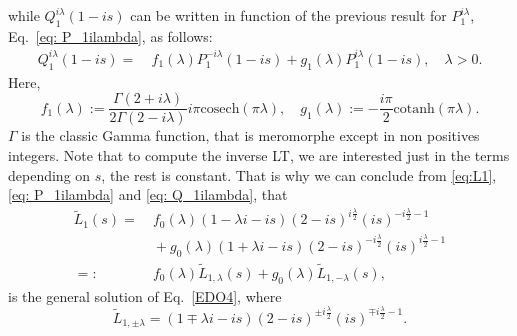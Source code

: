 \documentclass[%
 aip,
 jmp,%
 amsmath,amssymb,
 reprint,%
]{revtex4-2}
\begin{document}
while $Q_1^{i\lambda}(1-is)$ can be written in function of the previous result for $P_1^{i\lambda}$, Eq.~\eqref{eq: P_1ilambda}, as follows:
\begin{equation} \label{eq: Q_1ilambda}
    \begin{aligned}
    Q_1^{i\lambda}(1-is)= &~{} f_1(\lambda)P_1^{-i \lambda }(1-i s) + g_1(\lambda) P_1^{i \lambda }(1-i s), \quad \lambda>0. %
    \end{aligned}
\end{equation}
Here,
\[
f_1(\lambda):= \frac{ \Gamma (2+i \lambda)}{2 \Gamma (2-i \lambda )}i \pi  \text{cosech}(\pi  \lambda ), \quad g_1(\lambda) := -\frac{i \pi}{2}   \text{cotanh} (\pi  \lambda ).
\]
$\Gamma$ is the classic Gamma function, that is meromorphe except in non positives integers. Note that to compute the inverse LT, we are interested just in the terms depending on $s$, the rest is constant. That is why we can conclude from \eqref{eq:L1}, \eqref{eq: P_1ilambda} and \eqref{eq: Q_1ilambda}, that
\begin{equation}\label{L1_final}
\begin{aligned}
\widetilde L_1(s)= &~{} f_0(\lambda) (1-\lambda i-i s) (2-i s)^{i\frac{\lambda}{2} } (i s)^{-i\frac{\lambda}{2}-1} \\
&~{} + g_0(\lambda) (1+ \lambda i-i s) (2-i s)^{-i\frac{\lambda}{2} } (i s)^{i\frac{\lambda}{2}-1} \\
= : &~{} f_0(\lambda) \widetilde L_{1,\lambda}(s) +  g_0(\lambda) \widetilde L_{1,-\lambda}(s),
\end{aligned}
\end{equation}
is the general solution of Eq.~\eqref{EDO4}, where
\begin{equation*}
    \widetilde{L}_{1,\pm\lambda} = (1 \mp \lambda i-i s) (2-i s)^{\pm i\frac{\lambda}{2} } (i s)^{\mp i\frac{\lambda}{2}-1}.
\end{equation*}
\end{document}
